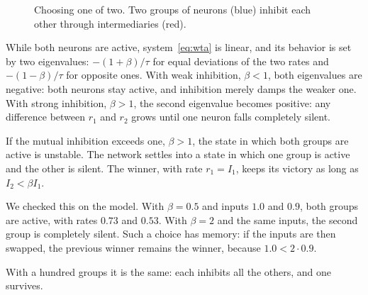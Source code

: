 \begin{figure}[t]
\centering
{}
\caption{Choosing one of two. Two groups of  neurons (blue) inhibit each other through  intermediaries (red).}
\label{fig:wta}
\end{figure}

While both neurons are active, system~\eqref{eq:wta} is linear, and its behavior is set by two eigenvalues: $-(1+\beta)/\tau$ for equal deviations of the two rates and $-(1-\beta)/\tau$ for opposite ones. With weak inhibition, $\beta<1$, both eigenvalues are negative: both neurons stay active, and inhibition merely damps the weaker one. With strong inhibition, $\beta>1$, the second eigenvalue becomes positive: any difference between $r_1$ and $r_2$ grows until one neuron falls completely silent.

\begin{keyblock}
\begin{proposition}
\label{prop:wta}
If the mutual inhibition exceeds one, $\beta>1$, the state in which both groups are active is unstable. The network settles into a state in which one group is active and the other is silent. The winner, with rate $r_1=I_1$, keeps its victory as long as $I_2<\beta I_1$.
\end{proposition}
\end{keyblock}

We checked this on the model. With $\beta=0.5$ and inputs $1.0$ and $0.9$, both groups are active, with rates $0.73$ and $0.53$. With $\beta=2$ and the same inputs, the second group is completely silent. Such a choice has memory: if the inputs are then swapped, the previous winner remains the winner, because $1.0<2\cdot0.9$.

With a hundred groups it is the same: each inhibits all the others, and one survives.

